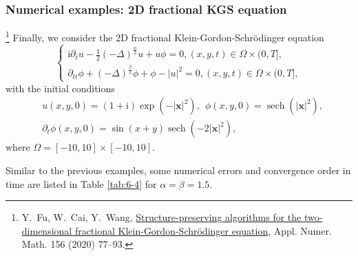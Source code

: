\documentclass[aspectratio=169]{beamer}
\begin{document}
	\begin{frame}\frametitle{Numerical examples: 2D fractional KGS equation}
		\begin{example}\label{ex:4}
			\footnote{\tiny 	Y.~Fu, W.~Cai, Y.~Wang,
			\href{https://www.sciencedirect.com/science/article/pii/S0168927420301264}{Structure-preserving
			algorithms for the two-dimensional fractional {{Klein-Gordon-Schr\"odinger}}
			equation}, Appl. Numer. Math. 156 (2020) 77--93.}
			Finally, we consider the 2D fractional Klein-Gordon-Schr{\"o}dinger equation
			{\footnotesize\begin{equation}
			\begin{cases}
			\mathrm{i} \partial_t u-\frac{1}{2}(-\Delta)^{\frac{\alpha}{2}} u+u \phi=0,(x, y, t) \in \Omega \times(0, T],\\
			\partial_{t t} \phi+(-\Delta)^{\frac{\beta}{2}} \phi+\phi-|u|^2=0, (x, y, t) \in \Omega \times(0, T],
			\end{cases}
			\end{equation}}
			with the initial conditions
			{\footnotesize \begin{equation}
			\begin{aligned}
				&u(x, y, 0)=(1+\mathrm{i}) \exp \left(-|\boldsymbol{x}|^2\right),~~\phi(x, y, 0)=\operatorname{sech}\left(|\boldsymbol{x}|^2\right),\\
			& \partial_t \phi(x, y, 0)=\sin (x+y) \operatorname{sech}\left(-2|\boldsymbol{x}|^2\right),
			\end{aligned}
			\end{equation}}
			where $\Omega=[-10,10] \times[-10,10]$.
			\end{example}
		
		{\footnotesize Similar to the previous examples, some numerical errors and convergence order in time are listed in Table \ref{tab:6-4} for $\alpha=\beta=1.5$.}
		\end{frame}
	
\end{document}
